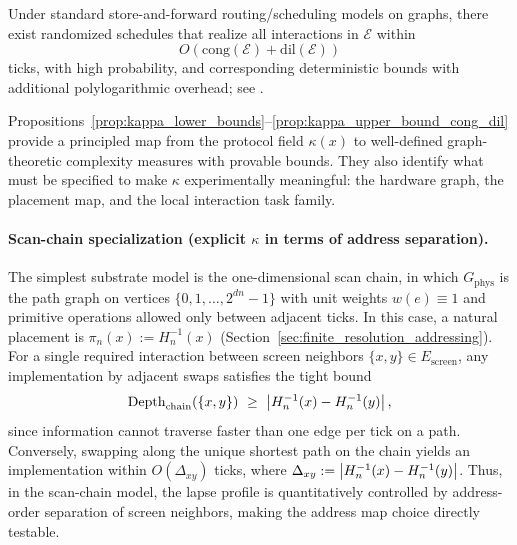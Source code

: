 \begin{proposition}
\label{prop:kappa_upper_bound_cong_dil}
Under standard store-and-forward routing/scheduling models on graphs, there exist randomized schedules that realize all interactions in $\mathcal{E}$ within
\[
O\!\left(\mathrm{cong}(\mathcal{E})+\mathrm{dil}(\mathcal{E})\right)
\]
ticks, with high probability, and corresponding deterministic bounds with additional polylogarithmic overhead; see \cite{LeightonMaggsRao1994}.
\end{proposition}

Propositions~\ref{prop:kappa_lower_bounds}--\ref{prop:kappa_upper_bound_cong_dil} provide a principled map from the protocol field $\kappa(x)$ to well-defined graph-theoretic complexity measures with provable bounds.
They also identify what must be specified to make $\kappa$ experimentally meaningful: the hardware graph, the placement map, and the local interaction task family.

\paragraph{Scan-chain specialization (explicit \texorpdfstring{$\kappa$}{kappa} in terms of address separation).}
The simplest substrate model is the one-dimensional scan chain, in which $G_{\mathrm{phys}}$ is the path graph on vertices $\{0,1,\dots,2^{dn}-1\}$ with unit weights $w(e)\equiv 1$ and primitive operations allowed only between adjacent ticks.
In this case, a natural placement is $\pi_n(x):=H_n^{-1}(x)$ (Section~\ref{sec:finite_resolution_addressing}).
For a single required interaction between screen neighbors $\{x,y\}\in E_{\mathrm{screen}}$, any implementation by adjacent swaps satisfies the tight bound
\[
\mathrm{Depth}_{\mathrm{chain}}(\{x,y\})\ \ge\ \abs{H_n^{-1}(x)-H_n^{-1}(y)},
\]
since information cannot traverse faster than one edge per tick on a path.
Conversely, swapping along the unique shortest path on the chain yields an implementation within $O(\Delta_{xy})$ ticks, where $\Delta_{xy}:=\left\lvert H_n^{-1}(x)-H_n^{-1}(y)\right\rvert$.
Thus, in the scan-chain model, the lapse profile is quantitatively controlled by address-order separation of screen neighbors, making the address map choice directly testable.

